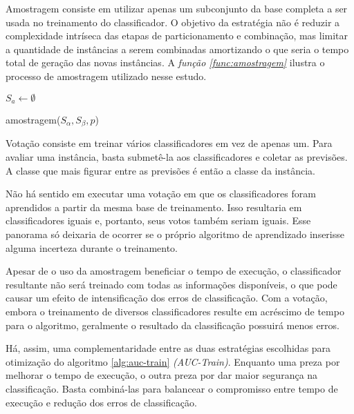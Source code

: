 Amostragem consiste em utilizar apenas um subconjunto da base completa a ser usada no treinamento do classificador. O objetivo da estratégia não é reduzir a complexidade intríseca das etapas de particionamento e combinação, mas limitar a quantidade de instâncias a serem combinadas amortizando o que seria o tempo total de geração das novas instâncias. A \emph{função \ref{func:amostragem}} ilustra o processo de amostragem utilizado nesse estudo.

\begin{function}[h!]

    $S_a \gets \emptyset$\;
    


    \caption{amostragem($S_{\alpha}, S_{\beta}, p$)}
    \label{func:amostragem}
\end{function}

Votação consiste em treinar vários classificadores em vez de apenas um. Para avaliar uma instância, basta submetê-la aos classificadores e coletar as previsões. A classe que mais figurar entre as previsões é então a classe da instância.

Não há sentido em executar uma votação em que os classificadores foram aprendidos a partir da mesma base de treinamento. Isso resultaria em classificadores iguais e, portanto, seus votos também seriam iguais. Esse panorama só deixaria de ocorrer se o próprio algoritmo de aprendizado inserisse alguma incerteza durante o treinamento.

Apesar de o uso da amostragem beneficiar o tempo de execução, o classificador resultante não será treinado com todas as informações disponíveis, o que pode causar um efeito de intensificação dos erros de classificação. Com a votação, embora o treinamento de diversos classificadores resulte em acréscimo de tempo para o algoritmo, geralmente o resultado da classificação possuirá menos erros.

Há, assim, uma complementaridade entre as duas estratégias escolhidas para otimização do algoritmo \ref{alg:auc-train} \emph{(AUC-Train)}. Enquanto uma preza por melhorar o tempo de execução, o outra preza por dar maior segurança na classificação. Basta combiná-las para balancear o compromisso entre tempo de execução e redução dos erros de classificação.

